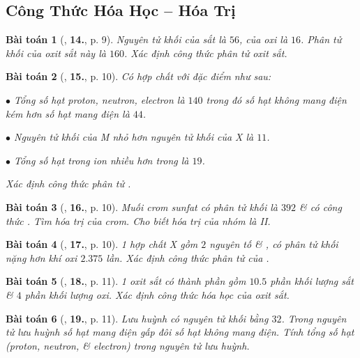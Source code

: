 \documentclass{article}
\numberwithin{equation}{section}
\newtheorem{baitoan}{Bài toán}[section]
\begin{document}

\subsection{Công Thức Hóa Học -- Hóa Trị}

\begin{baitoan}[\cite{An2011}, \textbf{14.}, p. 9]
	Nguyên tử khối của sắt là $56$, của oxi là $16$. Phân tử khối của oxit sắt này là $160$. Xác định công thức phân tử oxit sắt.
\end{baitoan}

\begin{baitoan}[\cite{An2011}, \textbf{15.}, p. 10]
	Có hợp chất  với đặc điểm như sau:
	\begin{enumerate*}
		\item[$\bullet$] Tổng số hạt proton, neutron, electron là $140$ trong đó số hạt không mang điện kém hơn số hạt mang điện là $44$.
		\item[$\bullet$] Nguyên tử khối của M nhỏ hơn nguyên tử khối của X là $11$.
		\item[$\bullet$] Tổng số hạt trong ion  nhiều hơn trong  là $19$.
	\end{enumerate*}
	Xác định công thức phân tử .
\end{baitoan}

\begin{baitoan}[\cite{An2011}, \textbf{16.}, p. 10]
	Muối crom sunfat có phân tử khối là $392$ \& có công thức . Tìm hóa trị của crom. Cho biết hóa trị của nhóm  là II.
\end{baitoan}

\begin{baitoan}[\cite{An2011}, \textbf{17.}, p. 10]
	1 hợp chất X gồm $2$ nguyên tố  \& , có phân tử khối nặng hơn khí oxi $2.375$ lần. Xác định công thức phân tử của .
\end{baitoan}

\begin{baitoan}[\cite{An2011}, \textbf{18.}, p. 11]
	1 oxit sắt có thành phần gồm $10.5$ phần khối lượng sắt \& $4$ phần khối lượng oxi. Xác định công thức hóa học của oxit sắt.
\end{baitoan}

\begin{baitoan}[\cite{An2011}, \textbf{19.}, p. 11]
	Lưu huỳnh có nguyên tử khối bằng $32$. Trong nguyên tử lưu huỳnh số hạt mang điện gấp đôi số hạt không mang điện. Tính tổng số hạt (proton, neutron, \& electron) trong nguyên tử lưu huỳnh.
\end{baitoan}
\end{document}

